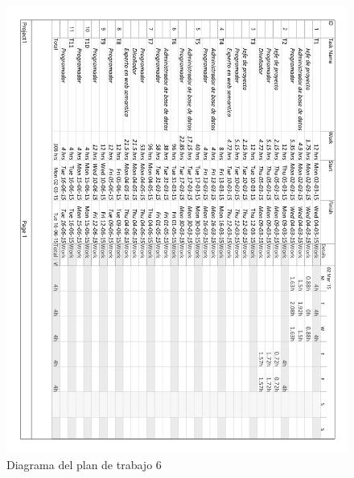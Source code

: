 \begin{figure}[!htp]
	\centering
	\includegraphics[page=6, scale=.8]{fig/real_work_plan_diagram}
	\caption{Diagrama del plan de trabajo 6}
\end{figure}

